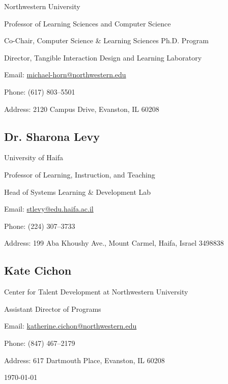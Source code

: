 \documentclass[11pt,letterpaper]{report} %
\newcommand{\listitemspace}{0.25em}
\renewenvironment{itemize}
{\begin{list}{}{\setlength{\leftmargin}{0em}
                \setlength{\parskip}{0em}
                \setlength{\itemsep}{\listitemspace}
                \setlength{\parsep}{\listitemspace}}}
{\end{list}}
\begin{document}
    \begin{itemize}

        \item Northwestern University
        \item Professor of Learning Sciences and Computer Science
        \item Co-Chair, Computer Science \& Learning Sciences Ph.D. Program
        \item Director, Tangible Interaction Design and Learning Laboratory
        \item Email: \href{mailto:michael-horn@northwestern.edu}{michael-horn@northwestern.edu}
        \item Phone: (617) 803--5501
        \item Address: 2120 Campus Drive, Evanston, IL 60208

    \end{itemize}


    \subsection*{Dr. Sharona Levy}

    \begin{itemize}
        \item University of Haifa
        \item Professor of Learning, Instruction, and Teaching
        \item Head of Systems Learning \& Development Lab
        \item Email: \href{mailto:stlevy@edu.haifa.ac.il}{stlevy@edu.haifa.ac.il}
        \item Phone: (224) 307--3733
        \item Address: 199 Aba Khoushy Ave., Mount Carmel, Haifa, Israel 3498838
    \end{itemize}


    \subsection*{Kate Cichon}

    \begin{itemize}
        \item Center for Talent Development at Northwestern University
        \item Assistant Director of Programs
        \item Email: \href{mailto:katherine.cichon@northwestern.edu}{katherine.cichon@northwestern.edu}
        \item Phone: (847) 467--2179
        \item Address: 617 Dartmouth Place, Evanston, IL 60208
    \end{itemize}


    \begin{center}
        \vfill
        \monthyeardate\today
    \end{center}
\end{document}
